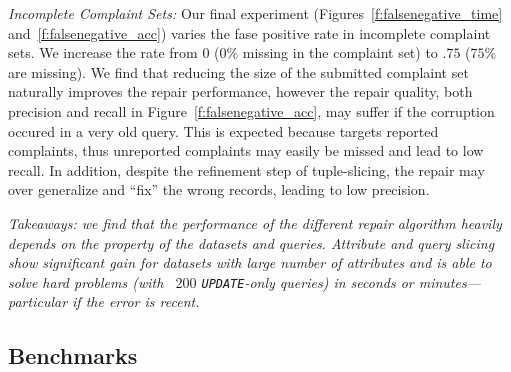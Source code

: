 \emph{Incomplete Complaint Sets:}
Our final experiment (Figures~\ref{f:falsenegative_time} and~\ref{f:falsenegative_acc}) varies the fase positive rate in incomplete complaint sets.
We increase the rate from $0$ ($0\%$ missing in the complaint set) to $.75$ ($75\%$ are missing).  
We find that reducing the size of the submitted complaint set naturally improves the repair performance,
however the repair quality, both precision and recall in Figure~\ref{f:falsenegative_acc}, may suffer if the corruption occured in a very old query. 
This is expected because \sys targets reported complaints, thus unreported complaints may easily be missed and lead to low recall.
In addition, despite the refinement step of tuple-slicing, the repair may over generalize and ``fix'' the wrong records, leading to low precision.
% 
\smallskip

\textit{Takeaways: we find that the performance of the different repair algorithm 
heavily depends on the property of the datasets and queries. Attribute and query slicing show significant gain for 
datasets with large number of attributes and \sys is able to solve hard problems
(with ~$200$ \texttt{UPDATE}-only queries) in seconds or minutes---particular if the error is recent. }













\subsection{Benchmarks}
\label{sec:experiments:benchmark}

